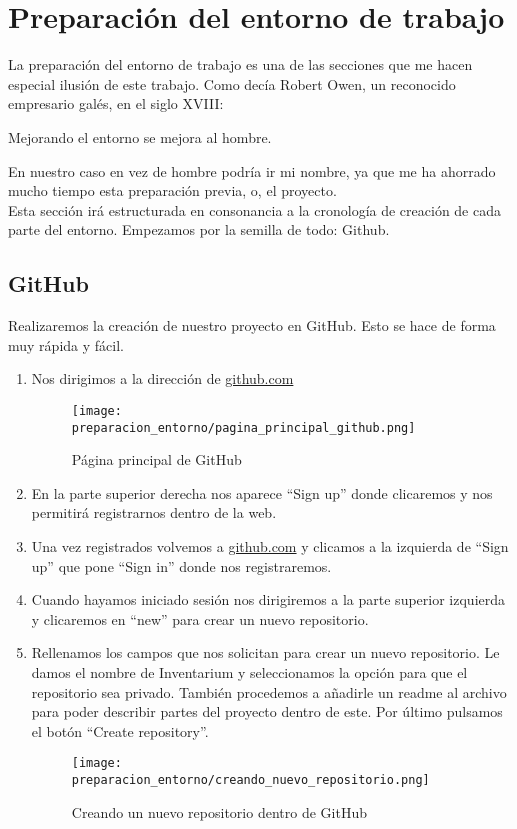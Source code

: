 \section{Preparación del entorno de trabajo}

La preparación del entorno de trabajo es una de las secciones que me hacen especial ilusión de este trabajo. Como decía Robert Owen, un reconocido empresario galés, en el siglo XVIII:

\begin{displayquote}
Mejorando el entorno se mejora al hombre.
\end{displayquote}

En nuestro caso en vez de hombre podría ir mi nombre, ya que me ha ahorrado mucho tiempo esta preparación previa, o, el proyecto.
\\Esta sección irá estructurada en consonancia a la cronología de creación de cada parte del entorno. Empezamos por la semilla de todo: Github.

\subsection{GitHub}
Realizaremos la creación de nuestro proyecto en GitHub. Esto se hace de forma muy rápida y fácil.

\begin{enumerate}
    \item Nos dirigimos a la dirección de \url{github.com} 
    \begin{figure}[htbp]
        \centering
            \texttt{[image: preparacion\_entorno/pagina\_principal\_github.png]}
            \caption{Página principal de GitHub}
    \end{figure}
    \item En la parte superior derecha nos aparece ``Sign up'' donde clicaremos y nos permitirá registrarnos dentro de la web.
    \item Una vez registrados volvemos a \url{github.com} y clicamos a la izquierda de ``Sign up'' que pone ``Sign in'' donde nos registraremos.
    \item Cuando hayamos iniciado sesión nos dirigiremos a la parte superior izquierda y clicaremos en ``new'' para crear un nuevo repositorio.
    \item Rellenamos los campos que nos solicitan para crear un nuevo repositorio. Le damos el nombre de Inventarium y seleccionamos la opción para que el repositorio sea privado. También procedemos a añadirle un readme al archivo para poder describir partes del proyecto dentro de este. Por último pulsamos el botón ``Create repository''.
    \begin{figure}[htbp]
        \centering
            \texttt{[image: preparacion\_entorno/creando\_nuevo\_repositorio.png]}
            \caption{Creando un nuevo repositorio dentro de GitHub}
    \end{figure}
\end{enumerate}

